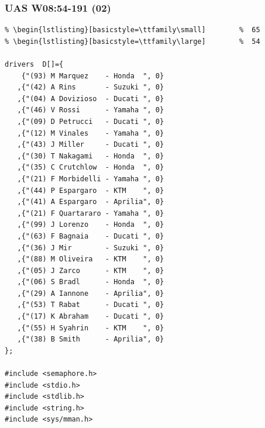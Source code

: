 \documentclass[xcolor=table, notheorems, hyperref={pdfpagelabels=false}]{beamer}
\begin{document}
\begin{frame}[fragile]
\frametitle{UAS W08:54-191 (02)}
\begin{lstlisting}[basicstyle=\ttfamily\tiny]         % 108
% \begin{lstlisting}[basicstyle=\ttfamily\footnotesize] %  72
% \begin{lstlisting}[basicstyle=\ttfamily\small]        %  65
% \begin{lstlisting}[basicstyle=\ttfamily\large]        %  54

drivers  D[]={
    {"(93) M Marquez    - Honda  ", 0}
   ,{"(42) A Rins       - Suzuki ", 0}
   ,{"(04) A Dovizioso  - Ducati ", 0}
   ,{"(46) V Rossi      - Yamaha ", 0}
   ,{"(09) D Petrucci   - Ducati ", 0}
   ,{"(12) M Vinales    - Yamaha ", 0}
   ,{"(43) J Miller     - Ducati ", 0}
   ,{"(30) T Nakagami   - Honda  ", 0}
   ,{"(35) C Crutchlow  - Honda  ", 0}
   ,{"(21) F Morbidelli - Yamaha ", 0}
   ,{"(44) P Espargaro  - KTM    ", 0}
   ,{"(41) A Espargaro  - Aprilia", 0}
   ,{"(21) F Quartararo - Yamaha ", 0}
   ,{"(99) J Lorenzo    - Honda  ", 0}
   ,{"(63) F Bagnaia    - Ducati ", 0}
   ,{"(36) J Mir        - Suzuki ", 0}
   ,{"(88) M Oliveira   - KTM    ", 0}
   ,{"(05) J Zarco      - KTM    ", 0}
   ,{"(06) S Bradl      - Honda  ", 0}
   ,{"(29) A Iannone    - Aprilia", 0}
   ,{"(53) T Rabat      - Ducati ", 0}
   ,{"(17) K Abraham    - Ducati ", 0}
   ,{"(55) H Syahrin    - KTM    ", 0}
   ,{"(38) B Smith      - Aprilia", 0}
};

#include <semaphore.h>
#include <stdio.h>
#include <stdlib.h>
#include <string.h>
#include <sys/mman.h>

\end{lstlisting}
\end{frame}
\end{document}
